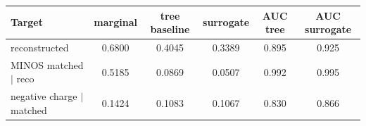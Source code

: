 \begin{tabular}{lccccc}
\toprule
Target & marginal & tree baseline & surrogate & AUC tree & AUC surrogate \\
\midrule
reconstructed & 0.6800 & 0.4045 & 0.3389 & 0.895 & 0.925 \\
MINOS matched $\mid$ reco & 0.5185 & 0.0869 & 0.0507 & 0.992 & 0.995 \\
negative charge $\mid$ matched & 0.1424 & 0.1083 & 0.1067 & 0.830 & 0.866 \\
\bottomrule
\end{tabular}

